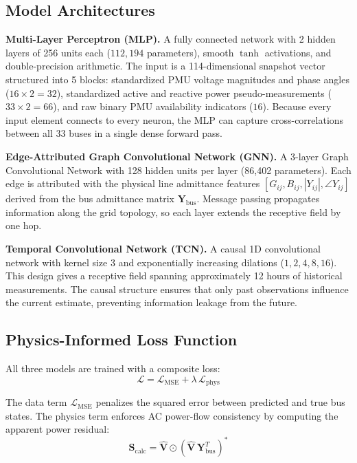 \documentclass[conference]{IEEEtran}
\begin{document}
\subsection{Model Architectures}

\textbf{Multi-Layer Perceptron (MLP).} A fully connected network with 2 hidden layers of 256 units each ($112{,}194$ parameters), smooth $\tanh$ activations, and double-precision arithmetic. The input is a 114-dimensional snapshot vector structured into 5 blocks: standardized PMU voltage magnitudes and phase angles ($16 \times 2 = 32$), standardized active and reactive power pseudo-measurements ($33 \times 2 = 66$), and raw binary PMU availability indicators ($16$). Because every input element connects to every neuron, the MLP can capture cross-correlations between all 33 buses in a single dense forward pass.

\textbf{Edge-Attributed Graph Convolutional Network (GNN).} A 3-layer Graph Convolutional Network with 128 hidden units per layer (86,402 parameters). Each edge is attributed with the physical line admittance features $[G_{ij}, B_{ij}, |Y_{ij}|, \angle Y_{ij}]$ derived from the bus admittance matrix $\mathbf{Y}_{\text{bus}}$. Message passing propagates information along the grid topology, so each layer extends the receptive field by one hop.

\textbf{Temporal Convolutional Network (TCN).} A causal 1D convolutional network with kernel size 3 and exponentially increasing dilations ($1, 2, 4, 8, 16$). This design gives a receptive field spanning approximately 12 hours of historical measurements. The causal structure ensures that only past observations influence the current estimate, preventing information leakage from the future.

\subsection{Physics-Informed Loss Function}

All three models are trained with a composite loss:
\begin{equation}
    \mathcal{L} = \mathcal{L}_{\text{MSE}} + \lambda \, \mathcal{L}_{\text{phys}}
    \label{eq:loss}
\end{equation}

The data term $\mathcal{L}_{\text{MSE}}$ penalizes the squared error between predicted and true bus states. The physics term enforces AC power-flow consistency by computing the apparent power residual:
\begin{equation}
    \mathbf{S}_{\text{calc}} = \hat{\mathbf{V}} \odot \left(\hat{\mathbf{V}} \, \mathbf{Y}_{\text{bus}}^T\right)^{*}
    \label{eq:physics}
\end{equation}
\end{document}
